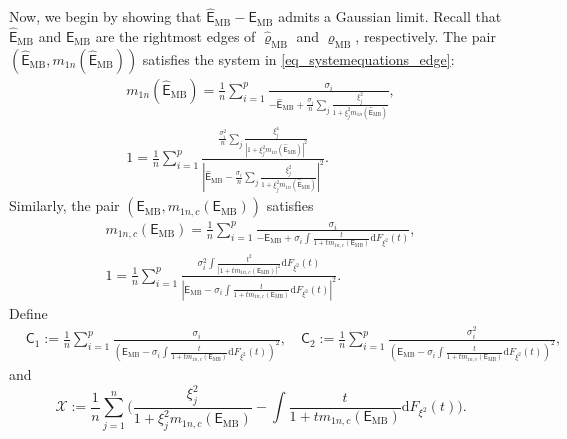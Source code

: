 \documentclass[12pt]{article}
\theoremstyle{plain}
\numberwithin{equation}{section}
\begin{document}
Now, we begin by showing that $\widehat{\mathsf{E}}_{\mathrm{MB}}-\mathsf{E}_{\mathrm{MB}}$ admits a Gaussian limit. Recall that $\widehat{\mathsf{E}}_{\mathrm{MB}}$ and $\mathsf{E}_{\mathrm{MB}}$ are the rightmost edges of $\widehat{\varrho}_{\mathrm{MB}}$ and $\varrho_{\mathrm{MB}}$, respectively. The pair $(\widehat{\mathsf{E}}_{\mathrm{MB}}, m_{1n}(\widehat{\mathsf{E}}_{\mathrm{MB}}))$ satisfies the system in \eqref{eq_systemequations_edge}:
\begin{gather}\label{eq_edgeequations1}
	m_{1n}(\widehat{\mathsf{E}}_{\mathrm{MB}})=\frac{1}{n}\sum_{i=1}^p \frac{\sigma_i}{-\widehat{\mathsf{E}}_{\mathrm{MB}}+\frac{\sigma_i}{n}\sum_j\frac{\xi^2_j}{1+\xi^2_jm_{1n}(\widehat{\mathsf{E}}_{\mathrm{MB}})}},\\ 1=\frac{1}{n}\sum_{i=1}^p \frac{\frac{\sigma_i^2}{n}\sum_j\frac{\xi^4_j}{|1+\xi^2_jm_{1n}(\widehat{\mathsf{E}}_{\mathrm{MB}})|^2}}{\left|\widehat{\mathsf{E}}_{\mathrm{MB}}-\frac{\sigma_i}{n}\sum_j\frac{\xi^2_j}{1+\xi^2_jm_{1n}(\widehat{\mathsf{E}}_{\mathrm{MB}})}\right|^2}. \nonumber
\end{gather}
Similarly, the pair $(\mathsf{E}_{\mathrm{MB}}, m_{1n,c}(\mathsf{E}_{\mathrm{MB}}))$ satisfies
\begin{gather}\label{eq_edgeequations2}
	m_{1n,c}(\mathsf{E}_{\mathrm{MB}})=\frac{1}{n}\sum_{i=1}^p\frac{\sigma_i}{-\mathsf{E}_{\mathrm{MB}}+\sigma_i\int\frac{t}{1+tm_{1n,c}(\mathsf{E}_{\mathrm{MB}})}\mathrm{d}F_{\xi^2}(t)},\\ 1=\frac{1}{n}\sum_{i=1}^p\frac{\sigma^2_i\int\frac{t^2}{|1+tm_{1n,c}(\mathsf{E}_{\mathrm{MB}})|^2}\mathrm{d}F_{\xi^2}(t)}{|\mathsf{E}_{\mathrm{MB}}-\sigma_i\int\frac{t}{1+tm_{1n,c}(\mathsf{E}_{\mathrm{MB}})}\mathrm{d}F_{\xi^2}(t)|^2}. \nonumber
\end{gather}
Define
\begin{align*}
	&\mathsf{C}_1:=\frac{1}{n} \sum_{i=1}^p \frac{\sigma_i}{ \left( \mathsf{E}_{\mathrm{MB}}- \sigma_i\int\frac{t}{1+tm_{1n,c}(\mathsf{E}_{\mathrm{MB}})}\mathrm{d}F_{\xi^2}(t)\right)^2},\quad \mathsf{C}_2:=\frac{1}{n} \sum_{i=1}^p \frac{\sigma_i^2}{ \left( \mathsf{E}_{\mathrm{MB}}- \sigma_i\int\frac{t}{1+tm_{1n,c}(\mathsf{E}_{\mathrm{MB}})}\mathrm{d}F_{\xi^2}(t)\right)^2},
\end{align*}
and
\begin{equation*}
	\mathcal{X}:=\frac{1}{n} \sum_{j=1}^n \Big( \frac{\xi_j^2}{1+\xi_j^2 m_{1n,c}(\mathsf{E}_{\mathrm{MB}})}-\int\frac{t}{1+tm_{1n,c}(\mathsf{E}_{\mathrm{MB}})}\mathrm{d}F_{\xi^2}(t)  \Big).
\end{equation*}
\end{document}
